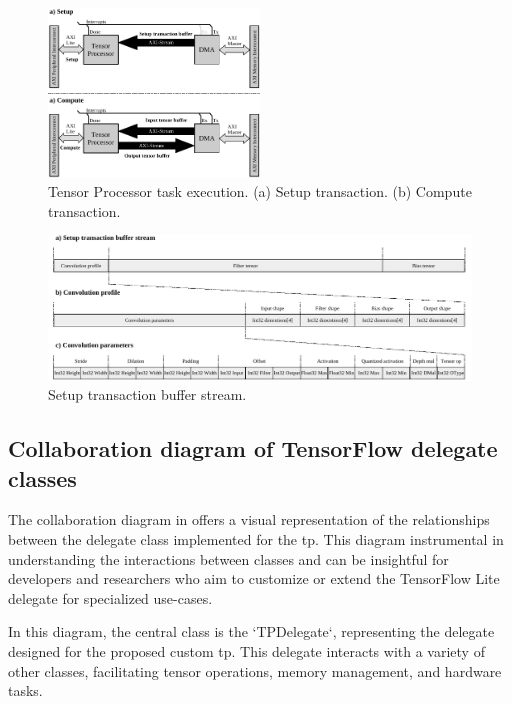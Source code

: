 \begin{figure}[h!]
	\centering
	\includegraphics[width=0.5\textwidth]{./figures/task_execution.pdf}
	\caption{Tensor Processor task execution. (a) Setup transaction. (b) Compute transaction.}
	\label{fig:sw_tp_delegate_job}
\end{figure}

\begin{figure}[h!]
	\centering
	\includegraphics[width=\textwidth]{./figures/setup_transaction_buffer_stream.pdf}
	\caption{Setup transaction buffer stream.}
	\label{fig:setup_transaction}
\end{figure}

\subsection{Collaboration diagram of TensorFlow delegate classes}
The collaboration diagram in  offers a visual representation of the relationships between the delegate class implemented for the \gls{tp}. This diagram instrumental in understanding the interactions between classes and can be insightful for developers and researchers who aim to customize or extend the TensorFlow Lite delegate for specialized use-cases.

In this diagram, the central class is the `TPDelegate`, representing the delegate designed for the proposed custom \gls{tp}. This delegate interacts with a variety of other classes, facilitating tensor operations, memory management, and hardware tasks.

